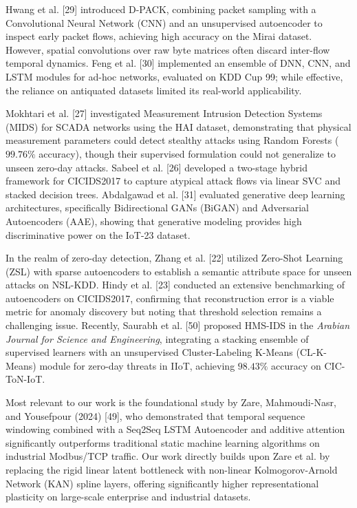 \documentclass[twocolumn]{article}
\begin{document}
Hwang et al. [29] introduced D-PACK, combining packet sampling with a Convolutional Neural Network (CNN) and an unsupervised autoencoder to inspect early packet flows, achieving high accuracy on the Mirai dataset. However, spatial convolutions over raw byte matrices often discard inter-flow temporal dynamics. Feng et al. [30] implemented an ensemble of DNN, CNN, and LSTM modules for ad-hoc networks, evaluated on KDD Cup 99; while effective, the reliance on antiquated datasets limited its real-world applicability.

Mokhtari et al. [27] investigated Measurement Intrusion Detection Systems (MIDS) for SCADA networks using the HAI dataset, demonstrating that physical measurement parameters could detect stealthy attacks using Random Forests ($99.76\%$ accuracy), though their supervised formulation could not generalize to unseen zero-day attacks. Sabeel et al. [26] developed a two-stage hybrid framework for CICIDS2017 to capture atypical attack flows via linear SVC and stacked decision trees. Abdalgawad et al. [31] evaluated generative deep learning architectures, specifically Bidirectional GANs (BiGAN) and Adversarial Autoencoders (AAE), showing that generative modeling provides high discriminative power on the IoT-23 dataset.

In the realm of zero-day detection, Zhang et al. [22] utilized Zero-Shot Learning (ZSL) with sparse autoencoders to establish a semantic attribute space for unseen attacks on NSL-KDD. Hindy et al. [23] conducted an extensive benchmarking of autoencoders on CICIDS2017, confirming that reconstruction error is a viable metric for anomaly discovery but noting that threshold selection remains a challenging issue. Recently, Saurabh et al. [50] proposed HMS-IDS in the \textit{Arabian Journal for Science and Engineering}, integrating a stacking ensemble of supervised learners with an unsupervised Cluster-Labeling K-Means (CL-K-Means) module for zero-day threats in IIoT, achieving $98.43\%$ accuracy on CIC-ToN-IoT.

Most relevant to our work is the foundational study by Zare, Mahmoudi-Nasr, and Yousefpour (2024) [49], who demonstrated that temporal sequence windowing combined with a Seq2Seq LSTM Autoencoder and additive attention significantly outperforms traditional static machine learning algorithms on industrial Modbus/TCP traffic. Our work directly builds upon Zare et al. by replacing the rigid linear latent bottleneck with non-linear Kolmogorov-Arnold Network (KAN) spline layers, offering significantly higher representational plasticity on large-scale enterprise and industrial datasets.
\end{document}
